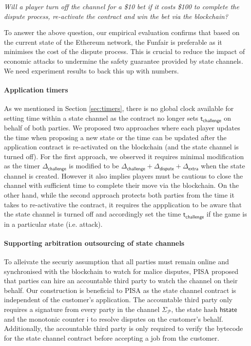 \documentclass{llncs}
\newcommand{\hstate}{\mathsf{hstate}}
\newcommand{\monotoniccounter}{\mathsf{i}}
\newcommand{\participant}{\mathcal{P}}
\newcommand{\timerchallenge}{\mathsf{\Delta}_{\mathsf{challenge}}}
\newcommand{\timechallenge}{\mathsf{t}_{\mathsf{challenge}}}
\newcommand{\timerextra}{\mathsf{\Delta}_{\mathsf{extra}}}
\newcommand{\timerdispute}{\mathsf{\Delta}_{\mathsf{dispute}}}
\begin{document}
\begin{center}
\textit{Will a player turn off the channel for a \$10 bet if it costs \$100 to complete the dispute process, re-activate the contract and win the bet via the blockchain?} 
\end{center} 

To answer the above question, our empirical evaluation confirms that based on the current state of the Ethereum network, the Funfair is preferable as it minimises the cost of the dispute process. 
This is crucial to reduce the impact of economic attacks to undermine the safety guarantee provided by state channels. We need experiment results to back this up with numbers. 

\paragraph{Application timers} 
As we mentioned in Section \ref{sec:timers}, there is no global clock available for setting time within a state channel as the contract no longer sets $\timechallenge$ on behalf of both parties.
We proposed two approaches where each player updates the time when proposing a new state or the time can be updated after the application contract is re-activated on the blockchain (and the state channel is turned off).  
For the first approach, we observed it requires minimal modification as the timer $\timerchallenge$ is modified to be $\timerchallenge + \timerdispute + \timerextra$ when the state channel is created.
However it also implies players must be cautious to close the channel with sufficient time to complete their move via the blockchain.
On the other hand, while the second approach protects both parties from the time it takes to re-activative the contract, it requires the appplication to be aware that the state channel is turned off and accordingly set the time $\timechallenge$ if the game is in a particular state (i.e. attack). 

\paragraph{Supporting arbitration outsourcing of state channels} 
To alleivate the securiy assumption that all parties must remain online and synchronised with the blockchain to watch for malice disputes, PISA proposed that parties can hire an accountable third party to watch the channel on their behalf. 
Our construction is beneficial to PISA as the state channel contract is independent of the customer's application. 
The accountable third party only requires a signature from every party in the channel $\Sigma_{\participant}$, the state hash $\hstate$ and the monotonic counter $\monotoniccounter$ to resolve disputes on the customer's behalf. 
Additionally,  the accountable third party is only required to verify the bytecode for the state channel contract before accepting a job from the customer. 
\end{document}
